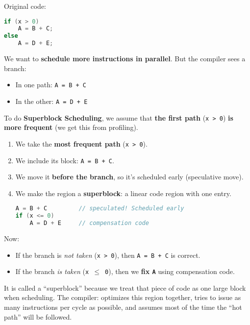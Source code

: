 \highspace
\begin{examplebox}[: Superblock]
    Original code:
    \begin{lstlisting}[language=c]
if (x > 0)
    A = B + C;
else
    A = D + E;\end{lstlisting}
    We want to \textbf{schedule more instructions in parallel}. But the compiler sees a branch:
    \begin{itemize}
        \item In one path: \texttt{A = B + C}
        \item In the other: \texttt{A = D + E}
    \end{itemize}
    To do \textbf{Superblock Scheduling}, we assume that \textbf{the first path} (\texttt{x > 0}) \textbf{is more frequent} (we get this from profiling).

    \begin{enumerate}
        \item We take the \textbf{most frequent path} (\texttt{x > 0}).
        \item We include its block: \texttt{A = B + C}.
        \item We move it \textbf{before the branch}, so it's scheduled early (speculative move).
        \item We make the region a \textbf{superblock}: a linear code region with one entry.
        \begin{lstlisting}[language=c]
A = B + C         // speculated! Scheduled early
if (x <= 0)
    A = D + E     // compensation code\end{lstlisting}
    \end{enumerate}
    Now:
    \begin{itemize}
        \item If the branch is \emph{not taken} (\texttt{x > 0}), then \texttt{A = B + C} is correct.
        \item If the branch \emph{is taken} (\texttt{x $\le$ 0}), then we \textbf{fix \texttt{A}} using compensation code.
    \end{itemize}
    It is called a ``superblock'' because we treat that piece of code as one large block when scheduling. The compiler: optimizes this region together, tries to issue as many instructions per cycle as possible, and assumes most of the time the ``hot path'' will be followed.
\end{examplebox}
